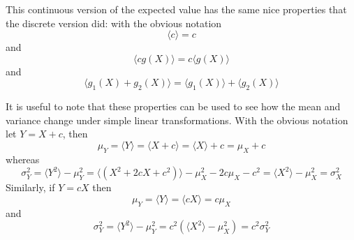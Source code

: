 \documentclass[11pt,a4paper]{scrartcl}
\begin{document}
This continuous version of the expected value has the same nice
properties that the discrete version did: with the obvious notation
\begin{equation}
\langle c\rangle=c
\end{equation}
and
\begin{equation}
\langle cg(X)\rangle =c\langle g(X)\rangle
\end{equation}
and 
\begin{equation}
\langle g_1(X)+g_2(X)\rangle =\langle g_1(X)\rangle +\langle g_2(X)\rangle
\end{equation}

It is useful to note that these properties can be used to see how the
mean and variance change under simple linear transformations. With the
obvious notation let $Y=X+c$, then
\begin{equation}
\mu_Y=\langle Y\rangle =\langle X+c\rangle=\langle X \rangle +c=\mu_X+c
\end{equation}
whereas
\begin{equation}
\sigma^2_Y=\langle Y^2\rangle-\mu_Y^2=\langle(X^2+2cX+c^2)\rangle-\mu_X^2-2c\mu_X-c^2=\langle X^2\rangle -\mu_X^2=\sigma_X^2
\end{equation}
Similarly, if $Y=cX$ then
\begin{equation}
\mu_Y=\langle Y\rangle=\langle cX\rangle=c\mu_X
\end{equation}
and
\begin{equation}
\sigma_Y^2=\langle Y^2\rangle -\mu_Y^2=c^2(\langle X^2\rangle-\mu_X^2)=c^2\sigma_Y^2\end{equation}

\newpage



\end{document}
